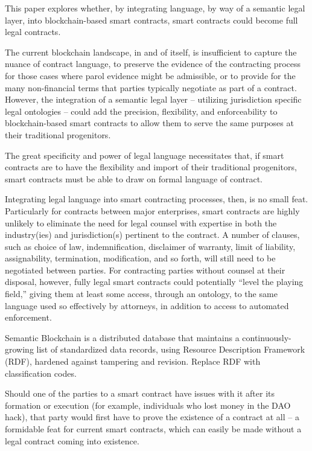 	      This paper explores
	      whether, by integrating language, by way of a semantic legal
	      layer, into blockchain-based smart contracts, smart contracts
	      could become full legal contracts. 
	      
	      The current blockchain landscape, in and of itself, is insufficient to capture the nuance of contract language, to preserve the evidence of the
	      contracting process for those cases where parol evidence might
	      be admissible, or to provide for the many non-financial terms
	      that parties typically negotiate as part of a contract. However,
	      the integration of a semantic legal layer – utilizing jurisdiction
	      specific legal ontologies – could add the precision, flexibility,
	      and enforceability to blockchain-based smart contracts to allow
	      them to serve the same purposes at their traditional progenitors. 
	      
	      
	      The great specificity and power of legal language necessitates that, if smart contracts are to have the flexibility and import of their traditional progenitors, smart contracts must be able to draw on
	      formal language of contract.
	      
	      Integrating legal language into smart contracting
	      processes, then, is no small feat. Particularly for contracts
	      between major enterprises, smart contracts are highly unlikely
	      to eliminate the need for legal counsel with expertise in both
	      the industry(ies) and jurisdiction(s) pertinent to the contract. A
	      number of clauses, such as choice of law, indemnification,
	      disclaimer of warranty, limit of liability, assignability,
	      termination, modification, and so forth, will still need to be
	      negotiated between parties. For contracting parties without
	      counsel at their disposal, however, fully legal smart contracts
	      could potentially “level the playing field,” giving them at least
	      some access, through an ontology, to the same language used
	      so effectively by attorneys, in addition to access to automated
	      enforcement. 
	      
	      Semantic Blockchain is a distributed database that maintains a continuously-growing list of standardized data records, using Resource Description Framework (RDF), hardened against tampering and
	      revision. Replace RDF with classification codes.
	      
	      Should one of the parties to a smart contract have issues with it after its formation or execution (for example, individuals who lost
	      money in the DAO hack), that party would first have to prove
	      the existence of a contract at all – a formidable feat for current
	      smart contracts, which can easily be made without a legal
	      contract coming into existence.
	      

